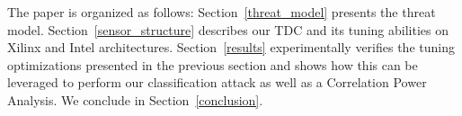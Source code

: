 The paper is organized as follows:
Section~\ref{threat_model} presents the threat model.
Section~\ref{sensor_structure} describes our \name TDC and its tuning abilities on Xilinx and Intel architectures.
Section~\ref{results} experimentally verifies the tuning optimizations presented in the previous section and shows how this can be leveraged to perform our classification attack as well as a Correlation Power Analysis. We conclude in Section~\ref{conclusion}. 